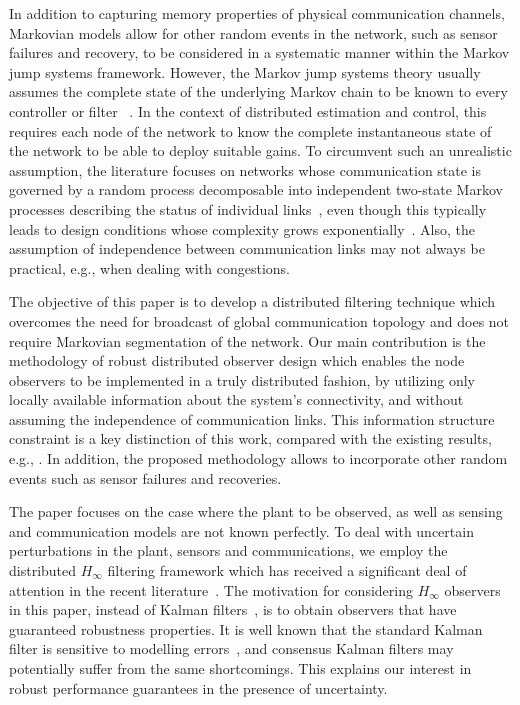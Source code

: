 \documentclass[a4paper,twocolumn]{autart}
\begin{document}
In addition to capturing memory properties of physical communication channels,
Markovian models allow for other random events in the
network, such as sensor failures and recovery,  to be considered in a
systematic manner within the
Markov jump systems framework. However, the Markov jump
systems theory usually assumes the complete
state of the underlying Markov chain to be known to every  controller or
filter~\cite{LUO1}
. In the context of
distributed estimation and control, this requires each node
of the network to know the complete instantaneous state of the network to
be able to deploy suitable gains. To circumvent such an
unrealistic assumption, the literature focuses on networks whose
communication state is governed by a random process decomposable
into independent two-state Markov processes describing the status of
individual links~\cite{LGM-2006,SS-2009}, even though this typically leads to  design conditions whose complexity
grows exponentially~\cite{LGM-2006}. Also, the
assumption of independence between communication links may not always be
practical, e.g., when dealing with congestions.

The objective of this paper is to develop a distributed filtering technique
which overcomes the need for broadcast of global communication topology and
does not require Markovian segmentation of the network. Our main
contribution is the methodology of robust distributed observer design
which enables the node observers to be implemented in a truly distributed
fashion, by utilizing only locally available information about the system's
connectivity, and without assuming the independence of communication
links. This information structure constraint is a key
distinction of this work, compared with the existing results, e.g.,
\cite{SS-2009,LGM-2006}.  In addition, the proposed methodology allows to
incorporate other random events such as sensor failures and recoveries.   


The paper focuses on the case where the plant to be observed, as well
as sensing and communication models are not known perfectly. To deal with uncertain perturbations in the
plant, sensors and communications, we employ the distributed $H_\infty$
filtering framework which has received a significant deal of attention in
the recent literature~\cite{SWH-2010,U6,LaU1}. 
The motivation for
considering $H_\infty$ observers in this paper, instead of Kalman filters~\cite{SS-2009},
is to obtain observers that have guaranteed robustness 
properties. It is well known that the standard Kalman filter 
is sensitive to modelling errors~\cite{PSB}, and
consensus Kalman filters may
potentially suffer from the same shortcomings. 
This explains our interest in robust performance guarantees in the presence of  
uncertainty. 
\end{document}
